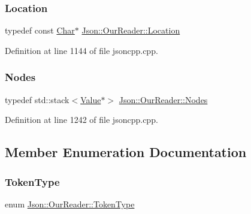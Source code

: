 \subsubsection{\texorpdfstring{Location}{Location}}
{\footnotesize\ttfamily typedef const \hyperlink{class_json_1_1_our_reader_a0cd0bab4caa66594ab843ccd5f9dc239}{Char}$\ast$ \hyperlink{class_json_1_1_our_reader_a1bdc7bbc52ba87cae6b19746f2ee0189}{Json\+::\+Our\+Reader\+::\+Location}}



Definition at line 1144 of file jsoncpp.\+cpp.

\hypertarget{class_json_1_1_our_reader_a8480a5ef159cee3a090f96358414d8d3}{}\label{class_json_1_1_our_reader_a8480a5ef159cee3a090f96358414d8d3} 
\subsubsection{\texorpdfstring{Nodes}{Nodes}}
{\footnotesize\ttfamily typedef std\+::stack$<$\hyperlink{class_json_1_1_value}{Value}$\ast$$>$ \hyperlink{class_json_1_1_our_reader_a8480a5ef159cee3a090f96358414d8d3}{Json\+::\+Our\+Reader\+::\+Nodes}\hspace{0.3cm}{\ttfamily [private]}}



Definition at line 1242 of file jsoncpp.\+cpp.



\subsection{Member Enumeration Documentation}
\hypertarget{class_json_1_1_our_reader_a15116f7276ddf1e7a2cc3cbefa884dcc}{}\label{class_json_1_1_our_reader_a15116f7276ddf1e7a2cc3cbefa884dcc} 
\subsubsection{\texorpdfstring{Token\+Type}{TokenType}}
{\footnotesize\ttfamily enum \hyperlink{class_json_1_1_our_reader_a15116f7276ddf1e7a2cc3cbefa884dcc}{Json\+::\+Our\+Reader\+::\+Token\+Type}\hspace{0.3cm}{\ttfamily [private]}}

